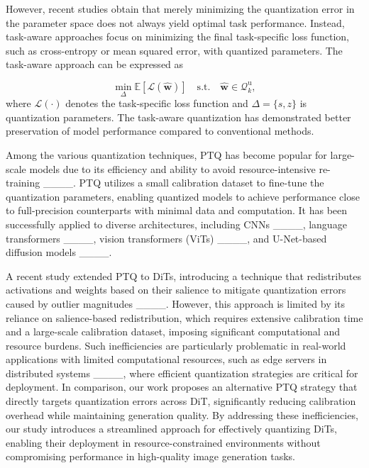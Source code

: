 However, recent studies obtain that merely minimizing the quantization error in the parameter space does not always yield optimal task performance. Instead, task-aware approaches focus on minimizing the final task-specific loss function, such as cross-entropy or mean squared error, with quantized parameters. The task-aware approach can be expressed as

\begin{equation}
\label{quantization obj}
\min_{\Delta} \mathbb{E}[\mathcal{L}(\hat{\mathbf{w}})] \quad \text{s.t.} \quad \hat{\mathbf{w}} \in \mathcal{Q}_k^\text{u},
\end{equation}
where $\mathcal{L}(\cdot)$ denotes the task-specific loss function and $\Delta=\{s,z\}$ is quantization parameters. The task-aware quantization has demonstrated better preservation of model performance compared to conventional methods.

Among the various quantization techniques, PTQ has become popular for large-scale models due to its efficiency and ability to avoid resource-intensive re-training ____. PTQ utilizes a small calibration dataset to fine-tune the quantization parameters, enabling quantized models to achieve performance close to full-precision counterparts with minimal data and computation. It has been successfully applied to diverse architectures, including CNNs ____, language transformers ____, vision transformers (ViTs) ____, and U-Net-based diffusion models ____.

A recent study extended PTQ to DiTs, introducing a technique that redistributes activations and weights based on their salience to mitigate quantization errors caused by outlier magnitudes ____. However, this approach is limited by its reliance on salience-based redistribution, which requires extensive calibration time and a large-scale calibration dataset, imposing significant computational and resource burdens. Such inefficiencies are particularly problematic in real-world applications with limited computational resources, such as edge servers in distributed systems ____, where efficient quantization strategies are critical for deployment. In comparison, our work proposes an alternative PTQ strategy that directly targets quantization errors across DiT, significantly reducing calibration overhead while maintaining generation quality. By addressing these inefficiencies, our study introduces a streamlined approach for effectively quantizing DiTs, enabling their deployment in resource-constrained environments without compromising performance in high-quality image generation tasks.